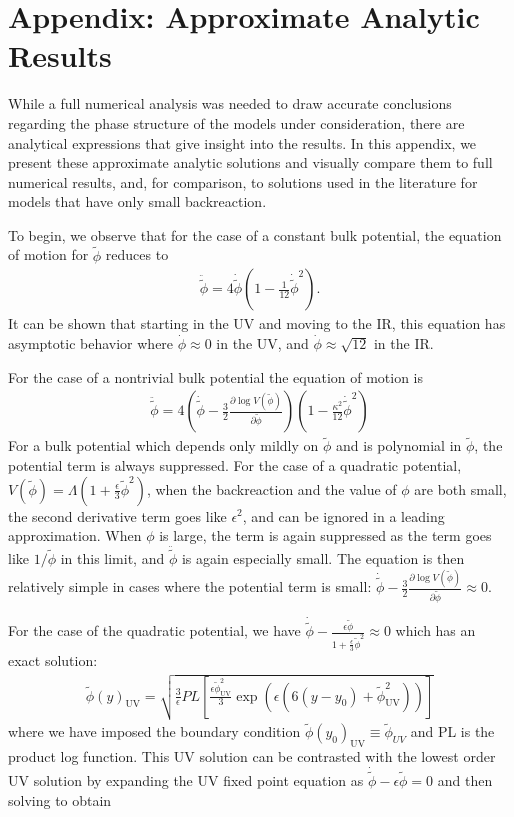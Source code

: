 \documentclass[12pt]{article}
\renewcommand{\tilde}{\widetilde} %
\newcommand{\beq}{\begin{eqnarray}}
\newcommand{\eeq}{\end{eqnarray}}
\begin{document}


\section{Appendix: Approximate Analytic Results}

While a full numerical analysis was needed to draw accurate conclusions regarding the phase structure of the  models under consideration, there are analytical expressions that give insight into the results.  In this appendix, we present these approximate analytic solutions and visually compare them to full numerical results, and, for comparison, to solutions used in the literature for models that have only small backreaction.

To begin, we observe that for the case of a constant bulk potential, the equation of motion for $ \tilde{\phi}  $ reduces to 
\beq
\ddot{\tilde{\phi}} = 4 \dot{\tilde{\phi}} \left(1 - \frac{1}{12}  \dot{\tilde{\phi}}^2 \right).
\eeq
It can be shown that starting in the UV and moving to the IR, this equation has asymptotic behavior where $\dot{\phi}\approx 0$ in the UV, and $\dot{\phi} \approx \sqrt{12}$ in the IR.   

For the case of a nontrivial bulk potential the equation of motion is 
 \beq
\ddot{\tilde{\phi}} = 4\left( \dot{\tilde{\phi}} - \frac{3}{2 } \frac{\partial \log V (\tilde{\phi})}{\partial \tilde{\phi}} \right) \left(1 - \frac{\kappa^2}{12}  \dot{\tilde{\phi}}^2 \right)
\eeq
For a bulk potential which depends only mildly on $\tilde{\phi}$ and is polynomial in $\tilde{\phi}$, the potential term is always suppressed.  For the case of a quadratic potential, $V(\tilde{\phi})= \Lambda(1+\frac{\epsilon}{3} \tilde{\phi}^2)$, when the backreaction and the value of $\phi$ are both small, the second derivative term goes like $\epsilon^2$, and can be ignored in a leading approximation.  When $\phi$ is large, the term is again suppressed as the term goes like $1/\tilde{\phi}$ in this limit, and $\ddot{\tilde{\phi}}$ is again especially small.  The equation is then relatively simple in cases where the potential term is small:
$\dot{\tilde{\phi}} - \frac{3}{2 } \frac{\partial \log V (\tilde{\phi})}{\partial \tilde{\phi}} \approx 0$.

For the case of the quadratic potential, we have $\dot{\tilde{\phi}} -  \frac{ \epsilon \tilde{\phi} }{ 1+ \frac{\epsilon}{3} \tilde{\phi}^2   } \approx 0$ which has an exact solution:
\beq
\tilde{\phi} (y)_\text{UV} = \sqrt{ \frac{3}{\epsilon}   PL \left[ \frac{\epsilon  \tilde{\phi}_\text{UV}^2 }{3} \exp  \left(  \epsilon( 6(y-y_0)+ \tilde{\phi}_\text{UV}^2 ) \right)       \right]   }
\eeq
where we have imposed the boundary condition $\tilde{\phi}(y_0)_\text{UV} \equiv \tilde{\phi}_{UV}$ and PL is the product log function. 
This UV solution can be contrasted with the lowest order UV solution by expanding the UV fixed point equation as  $\dot{\tilde{\phi}} -   \epsilon \tilde{\phi} = 0$ and then solving to obtain 
\end{document}
